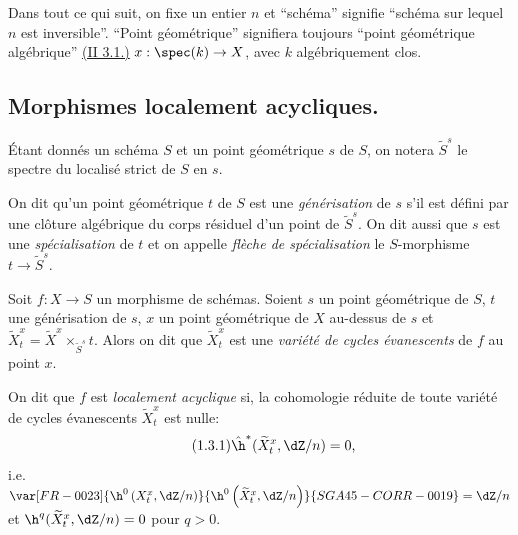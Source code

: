 Dans tout ce qui suit, on fixe un entier $n$ et ``schéma'' signifie ``schéma 
sur lequel $n$ est inversible''. ``Point géométrique'' signifiera toujours 
``point géométrique algébrique'' \hyperref[I:2-3-1]{(II 3.1.)} $x:\spec(k)\to X$, avec $k$ 
algébriquement clos. 










\subsection{Morphismes localement acycliques.}\label{I:5-1}





\begin{sourceexampledotdash}[Notation]\label{I:5-1-1}
Étant donnés un schéma $S$ et un point géométrique $s$ de $S$, on 
notera $\widetilde S^s$ le spectre du localisé strict de $S$ en $s$. 
\end{sourceexampledotdash}





\begin{definitiondotdash}\label{I:5-1-2}
On dit qu'un point géométrique $t$ de $S$ est une \emph{générisation} de 
$s$ s'il est défini par une clôture algébrique du corps résiduel d'un 
point de $\widetilde S^s$. On dit aussi que $s$ est une \emph{spécialisation} 
de $t$ et on appelle \emph{flèche de spécialisation} le $S$-morphisme 
$t\to \widetilde S^s$. 
\end{definitiondotdash}





\begin{definitiondotdash}\label{I:5-1-3}
Soit $f:X\to S$ un morphisme de schémas. Soient $s$ un point géométrique de 
$S$, $t$ une générisation de $s$, $x$ un point géométrique de $X$ 
au-dessus de $s$ et 
$\widetilde X_t^x = \widetilde X^x\times_{\widetilde S^s} t$. Alors on dit que 
$\widetilde X_t^x$ est une \emph{variété de cycles évanescents} de $f$ au 
point $x$. 

On dit que $f$ est \emph{localement acyclique} si, la cohomologie réduite de 
toute variété de cycles évanescents $\widetilde X_t^x$ est nulle:
\begingroup
\makeatletter
\tagsleft@true
\let\veqno\@@leqno
\makeatother
\begin{equation*}\tag{1.3.1}\label{I:eq:5-1-3-1}
  \hat\h^*(\widetilde X_t^x,\dZ/n) = 0\text{,}
\end{equation*}
\endgroup
i.e. $\var[FR-0023]{\h^0\left(X_t^x,\dZ/n\right)}{\h^0\left(\widetilde X_t^x,\dZ/n\right)}{SGA45-CORR-0019} = \dZ/n$ et 
$\h^q(\widetilde X_t^x,\dZ/n) = 0$ pour $q>0$. 
\end{definitiondotdash}





